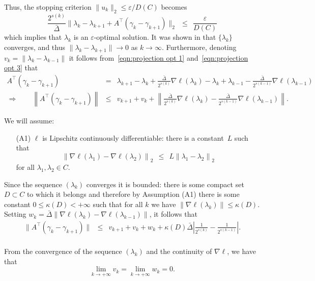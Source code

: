 \documentclass[article]{jss}
\begin{document}
{Thus, the stopping criterion $\|u_{k}\|_{2} \leq \varepsilon / D(C)$ becomes
\[
\frac{2^{s(k)}}{\bar{\Delta}} \Big\|\lambda_{k} - \lambda_{k+1} + A^{\top} (\gamma_{k} - \gamma_{k+1})\Big\|_{2} \ \ \leq \ \ \frac{\varepsilon}{D(C)}
\]
which implies that $\lambda_{k}$ is an $\varepsilon$-optimal solution.
It was shown in \cite{iusem2003} that $\{\lambda_{k}\}$ converges, and thus $\|\lambda_{k} - \lambda_{k+1}\| \to 0$ as $k \to \infty$.
Furthermore, denoting $v_k=\|\lambda_k - \lambda_{k-1}\|$ 
it follows from~\eqref{eqn:projection opt 1} and~\eqref{eqn:projection opt 3} that
\begin{eqnarray*}
A^{\top}(\gamma_{k} - \gamma_{k+1}) & = & \lambda_{k+1} - \lambda_{k} + \frac{\bar{\Delta}}{2^{s(k)}} \nabla \ell(\lambda_{k}) - \lambda_{k} + \lambda_{k-1} - \frac{\bar{\Delta}}{2^{s(k-1)}} \nabla \ell(\lambda_{k-1}) \\
\Rightarrow \qquad \left\|A^{\top}(\gamma_{k} - \gamma_{k+1})\right\| & \le & v_{k+1} + v_k + \left\|\frac{\bar{\Delta}}{2^{s(k)}} \nabla \ell(\lambda_{k}) - \frac{\bar{\Delta}}{2^{s(k-1)}} \nabla \ell(\lambda_{k-1})\right\|.
\end{eqnarray*}

We will assume:
\begin{itemize}
\item[(A1)] $\ell$ is Lipschitz continuously differentiable:
there is a constant~$L$ such that
\[
\left\|\nabla \ell(\lambda_{1}) - \nabla \ell(\lambda_{2})\right\|_{2} \ \ \le \ \ L \left\|\lambda_{1} - \lambda_{2}\right\|_{2}
\]
for all $\lambda_{1}, \lambda_{2} \in C$.
\end{itemize}
Since  the sequence $(\lambda_k)$ converges
it is bounded: there is some compact set $D \subset C$ to which it belongs and therefore 
by Assumption (A1) there
is some constant $0 \leq \kappa(D)<+\infty$ such that
for all $k$ we have
$\|\nabla \ell(\lambda_k)\| \leq \kappa(D)$. Setting $w_k={\bar \Delta}\|\nabla \ell(\lambda_k)-\nabla \ell(\lambda_{k-1})\|$, it follows that
\begin{eqnarray*}
\|A^{\top}(\gamma_{k} - \gamma_{k+1})\| & \leq &  v_{k+1} + v_{k}+ w_k + \kappa(D) {\bar \Delta}\left| 
\frac{1}{2^{s(k)}}-\frac{1}{2^{s(k-1)}}
\right|.
\\
\end{eqnarray*}

From the convergence of the sequence
$(\lambda_k)$ and the continuity of
$\nabla \ell$, we have that
$$
\displaystyle \lim_{k \rightarrow +\infty} v_k=\lim_{k \rightarrow +\infty} w_k= 0.
$$ 


}
\end{document}
